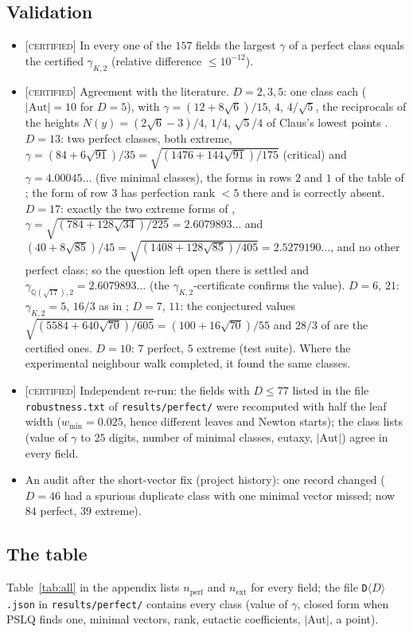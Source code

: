 \documentclass[11pt]{amsart}
\theoremstyle{definition}
\theoremstyle{remark}
\newcommand{\Q}{\mathbb{Q}}
\newcommand{\Aut}{\mathrm{Aut}}
\newcommand{\gK}{\gamma_{K,2}}
\newcommand{\nperf}{n_{\mathrm{perf}}}
\newcommand{\nex}{n_{\mathrm{ext}}}
\newcommand{\CERT}{\textsc{[certified]}}
\begin{document}
\subsection{Validation}\label{subsec:validation}
\begin{itemize}[leftmargin=*]
\item \CERT{} In every one of the $157$ fields the largest $\gamma$ of a perfect class equals the
certified $\gK$ (relative difference $\le10^{-12}$).
\item \CERT{} Agreement with the literature.  $D=2,3,5$: one class each \cite{BCIO}
($|\Aut|=10$ for $D=5$), with $\gamma=(12+8\sqrt6)/15$, $4$, $4/\sqrt5$, the reciprocals of the
heights $N(y)=(2\sqrt6-3)/4$, $1/4$, $\sqrt5/4$ of Claus's lowest points \cite[S\"atze~6, 3, 5]{Claus}.  $D=13$: two perfect classes, both extreme, $\gamma=(84+6\sqrt{91})/35
=\sqrt{(1476+144\sqrt{91})/175}$ (critical) and $\gamma=4.00045\ldots$ (five minimal classes),
the forms in rows $2$ and $1$ of the table of \cite[p.~916]{PW05}; the form of row $3$ has
perfection rank $<5$ there and is correctly absent.  $D=17$: exactly the two extreme forms of
\cite[pp.~918--919]{PW05}, $\gamma=\sqrt{(784+128\sqrt{34})/225}=2.6079893\ldots$ and
$(40+8\sqrt{85})/45=\sqrt{(1408+128\sqrt{85})/405}=2.5279190\ldots$, and no other perfect
class; so the question left open there is settled and $\gamma_{\Q(\sqrt{17}),2}=2.6079893\ldots$
(the $\gK$-certificate confirms the value).  $D=6$, $21$: $\gK=5$, $16/3$ as in \cite{PW09};
$D=7$, $11$: the conjectured values $\sqrt{(5584+640\sqrt{70})/605}=(100+16\sqrt{70})/55$ and
$28/3$ of \cite[p.~946]{PW09} are the certified ones.  $D=10$: $7$ perfect, $5$ extreme (test
suite).  Where the experimental
neighbour walk completed, it found the same classes.
\item \CERT{} Independent re-run: the fields with $D\le 77$ listed in the file
\texttt{robustness.txt} of \texttt{results/perfect/} were recomputed with half the leaf width
($w_{\min}=0.025$, hence different leaves and Newton starts); the class lists (value of
$\gamma$ to $25$ digits, number of minimal classes, eutaxy, $|\Aut|$) agree in every field.
\item An audit after the short-vector fix (project history): one record changed ($D=46$ had a
spurious duplicate class with one minimal vector missed; now $84$ perfect, $39$ extreme).
\end{itemize}

\subsection{The table}
Table~\ref{tab:all} in the appendix lists $\nperf$ and $\nex$ for every field; the file
\texttt{D$\langle D\rangle$.json} in \texttt{results/perfect/} contains every class (value of $\gamma$,
closed form when PSLQ finds one, minimal vectors, rank, eutactic coefficients, $|\Aut|$, a point).
\end{document}

